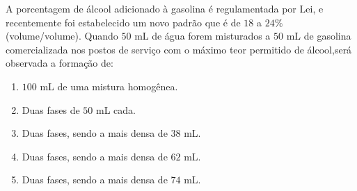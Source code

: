 A porcentagem de álcool adicionado à gasolina é regulamentada por Lei, e recentemente foi estabelecido um novo padrão que é de $18$ a $24\%$ (volume/volume).
Quando $50$ mL de água forem misturados a $50$ mL de gasolina comercializada nos postos de serviço com o máximo teor permitido de álcool,será observada a formação de:

\begin{enumerate}[label = (\alph*)]
	\item $100$ mL de uma mistura homogênea.
	\item Duas fases de $50$ mL cada.
	\item Duas fases, sendo a mais densa de $38$ mL.
	\item Duas fases, sendo a mais densa de $62$ mL.
	\item Duas fases, sendo a mais densa de $74$ mL.
\end{enumerate}

